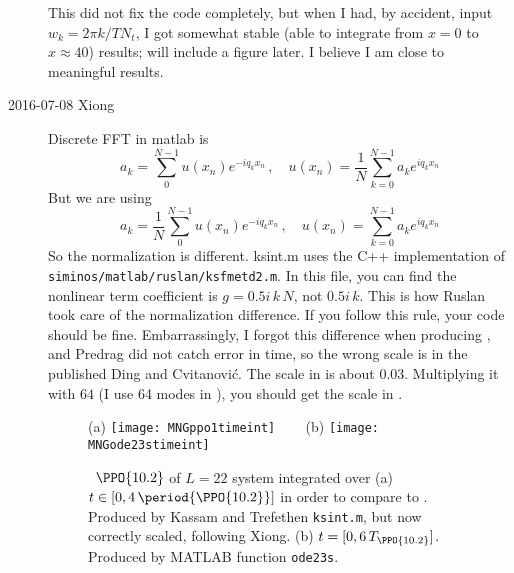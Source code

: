 \begin{description}
{This did not fix the code completely, but when I had, by accident, input
$w_k = 2\pi  k / T N_t$, I got somewhat stable (able to integrate from
$x=0$ to $x \approx 40$) results; will include a figure later. I believe
I am close to meaningful results.
}

\item[2016-07-08 Xiong]
Discrete FFT in matlab is
\[
  a_k = \sum^{N-1}_0 u(x_n) e^{-iq_kx_n} \,,\quad
  u(x_n) = \frac{1}{N} \sum_{k=0}^{N-1}a_k e^{iq_kx_n}
\]
But we are using
\[
  a_k = \frac{1}{N} \sum^{N-1}_0 u(x_n) e^{-iq_kx_n} \,,\quad
  u(x_n) = \sum_{k=0}^{N-1}a_k e^{iq_kx_n}
\]
So the normalization is different. ksint.m uses the C++ implementation of
\texttt{siminos/matlab/ruslan/ksfmetd2.m}. In this file, you can find the
nonlinear term coefficient is $g = 0.5i\,k\,N$, not $0.5i\,k$. This is how
Ruslan took care of the normalization difference. If you follow this
rule, your code should be fine. Embarrassingly, I forgot this difference
when producing , and Predrag did not catch error in
time, so the wrong scale is in the published Ding and
Cvitanovi{\'c}. The scale in  is
about 0.03. Multiplying it with $64$ (I use 64 modes in ),
you should get the scale in . %


\begin{figure}
    \centering
(a) \texttt{[image: MNGppo1timeint]}
~~~
(b) \texttt{[image: MNGode23stimeint]}
    \caption{\label{fig:MNGtimeintL22}
    \Ppo\ $\PPO{10.2}$ of $L=22$ system integrated over
    (a) $t\in[0,
    4\,\period{\PPO{10.2}}]$ in order to compare to .
    Produced by Kassam and Trefethen\rf{ks05com} \texttt{ksint.m}, but
    now correctly scaled, following Xiong.
    (b) $t=[0, 6\,T_{\PPO{10.2}}]$. Produced by MATLAB function
    \texttt{ode23s}.
    }
\end{figure}


\end{description}
